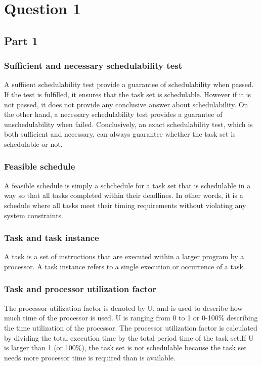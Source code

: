 \section{Question 1} 
        
        \subsection{Part 1}
            \subsubsection{\textbf{Sufficient and necessary schedulability test}}
            A suffiient schedulability test provide a guarantee of schedulability when passed. If the test is fulfilled, it ensures that the task set is schedulable. However if it is not passed, it does not provide any conclusive answer about schedulability. On the other hand, a necessary schedulability test provides a guarantee of unschedulability when failed. Conclusively, an exact schedulability test, which is both sufficient and necessary, can always guarantee whether the task set is schedulable or not.

            \subsubsection{\textbf{Feasible schedule}}
            A feasible schedule is simply a schchedule for a task set that is schedulable in a way so that all tasks completed within their deadlines. In other words, it is a schedule where all tasks meet their timing requirements without violating any system constraints.

            \subsubsection{\textbf{Task and task instance}}
            A task is a set of instructions that are executed within a larger program by a processor. A task instance refers to a single execution or occurrence of a task.

            \subsubsection{\textbf{Task and processor utilization factor}}
            The processor utilization factor is denoted by U, and is used to describe how much time of the processor is used. U is ranging from 0 to 1 or 0-100\% describing the time utilization of the processor. The processor utilization factor is calculated by dividing the total execution time by the total period time of the task set.If U is larger than 1 (or 100\%), the task set is not schedulable because the task set needs more processor time is required than is available.
            


